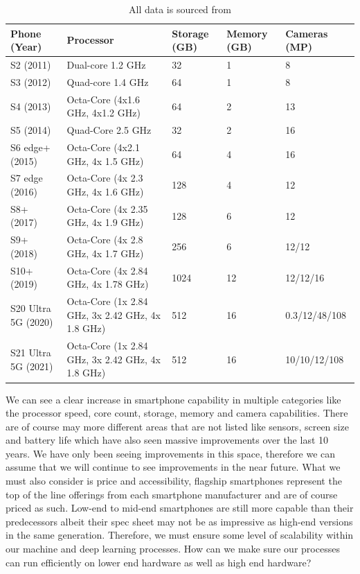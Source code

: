 \documentclass{article}
\begin{document}
\begin{table}[h!]
    \centering
    \begin{tabular}{ |m{2.5cm}|m{2.7cm}|m{1cm}|m{1.2cm}|m{2.5cm}| }
        \hline
        Phone (Year) & Processor & Storage (GB) & Memory (GB) & Cameras (MP) \\
        \hline
        \hline
        S2 (2011) & Dual-core 1.2 GHz & 32 & 1 & 8 \\
        \hline
        S3 (2012) & Quad-core 1.4 GHz & 64 & 1 & 8 \\
        \hline
        S4 (2013) & Octa-Core (4x1.6 GHz, 4x1.2 GHz) & 64 & 2 & 13 \\
        \hline
        S5 (2014) & Quad-Core 2.5 GHz & 32 & 2 & 16 \\
        \hline
        S6 edge+ (2015) & Octa-Core (4x2.1 GHz, 4x 1.5 GHz) & 64 & 4 & 16 \\
        \hline
        S7 edge (2016) & Octa-Core (4x 2.3 GHz, 4x 1.6 GHz) & 128 &	4 &	12 \\
        \hline
        S8+ (2017) & Octa-Core (4x 2.35 GHz, 4x 1.9 GHz) & 128 & 6 & 12 \\
        \hline
        S9+ (2018) & Octa-Core (4x 2.8 GHz, 4x 1.7 GHz) & 256 &	6 &	12/12 \\
        \hline
        S10+ (2019) & Octa-Core (4x 2.84 GHz, 4x 1.78 GHz) & 1024 &	12 & 12/12/16 \\
        \hline
        S20 Ultra 5G (2020) & Octa-Core (1x 2.84 GHz, 3x 2.42 GHz, 4x 1.8 GHz) & 512 & 16 & 0.3/12/48/108 \\
        \hline
        S21 Ultra 5G (2021) & Octa-Core (1x 2.84 GHz, 3x 2.42 GHz, 4x 1.8 GHz) & 512 & 16 &	10/10/12/108 \\
        \hline
    \end{tabular}
    \caption{All data is sourced from \cite{gsm}}
    \label{table:1}
\end{table}
\break
\clearpage

\par

We can see a clear increase in smartphone capability in multiple categories like the processor speed, core count, 
storage, memory and camera capabilities. There are of course may more different areas that are not listed like sensors, 
screen size and battery life which have also seen massive improvements over the last 10 years. We have only been seeing 
improvements in this space, therefore we can assume that we will continue to see improvements in the near future. 
What we must also consider is price and accessibility, flagship smartphones represent the top of the line offerings from
each smartphone manufacturer and are of course priced as such. Low-end to mid-end smartphones are still more capable 
than their predecessors albeit their spec sheet may not be as impressive as high-end versions in the same generation. 
Therefore, we must ensure some level of scalability within our machine and deep learning processes. How can we make 
sure our processes can run efficiently on lower end hardware as well as high end hardware?
\end{document}
